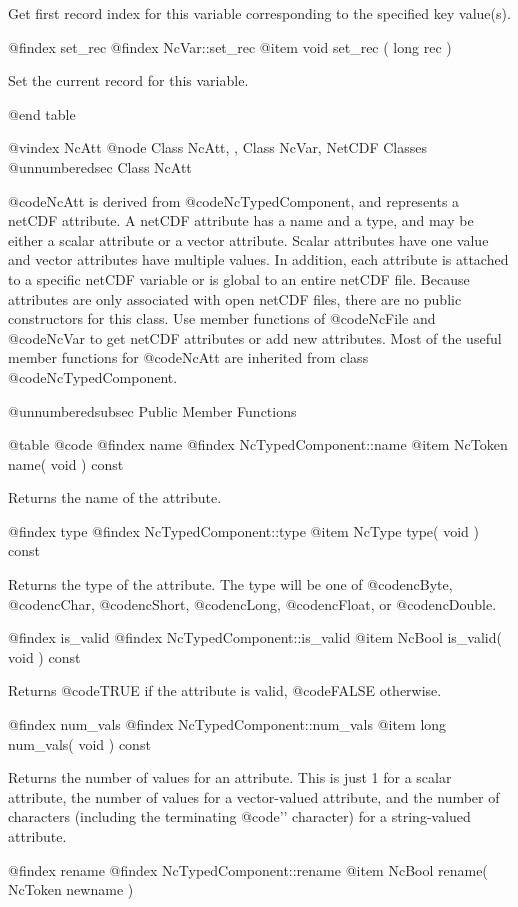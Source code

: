 Get first record index for this variable corresponding to the specified
key value(s).

@findex set_rec
@findex NcVar::set_rec
@item void set_rec ( long rec )

Set the current record for this variable.

@end table

@vindex NcAtt
@node Class NcAtt,  , Class NcVar, NetCDF Classes
@unnumberedsec  Class NcAtt

@code{NcAtt} is derived from @code{NcTypedComponent}, and represents a netCDF
attribute.  A netCDF attribute has a name and a type, and may be either
a scalar attribute or a vector attribute.  Scalar attributes have one
value and vector attributes have multiple values.  In addition, each
attribute is attached to a specific netCDF variable or is global to an
entire netCDF file.  Because attributes are only associated with open
netCDF files, there are no public constructors for this class.  Use
member functions of @code{NcFile} and @code{NcVar} to get netCDF
attributes or add new attributes.  Most of the useful member functions
for @code{NcAtt} are
inherited from class @code{NcTypedComponent}.

@unnumberedsubsec Public Member Functions

@table @code
@findex name
@findex NcTypedComponent::name
@item NcToken name( void ) const

Returns the name of the attribute.

@findex type
@findex NcTypedComponent::type
@item NcType type( void ) const

Returns the type of the attribute.  The type will be one of
@code{ncByte}, @code{ncChar}, @code{ncShort}, @code{ncLong},
@code{ncFloat}, or @code{ncDouble}.

@findex is_valid
@findex NcTypedComponent::is_valid
@item NcBool is_valid( void ) const

Returns @code{TRUE} if the attribute is valid, @code{FALSE} otherwise.

@findex num_vals
@findex NcTypedComponent::num_vals
@item long num_vals( void ) const

Returns the number of values for an attribute.  This is just 1 for a
scalar attribute, the number of values for a vector-valued attribute,
and the number of characters (including the terminating @code{'\0'}
character) for a string-valued attribute.

@findex rename
@findex NcTypedComponent::rename
@item NcBool rename( NcToken newname )

